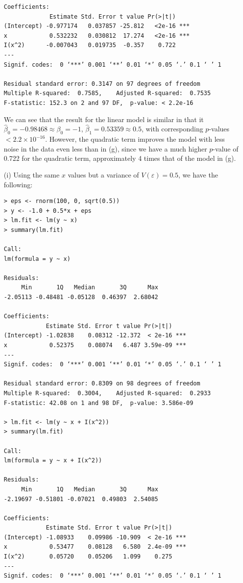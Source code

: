 \begin{itemize}
\begin{lstlisting}
Coefficients:
             Estimate Std. Error t value Pr(>|t|)
(Intercept) -0.977174   0.037857 -25.812   <2e-16 ***
x            0.532232   0.030812  17.274   <2e-16 ***
I(x^2)      -0.007043   0.019735  -0.357    0.722
---
Signif. codes:  0 ‘***’ 0.001 ‘**’ 0.01 ‘*’ 0.05 ‘.’ 0.1 ‘ ’ 1

Residual standard error: 0.3147 on 97 degrees of freedom
Multiple R-squared:  0.7585,    Adjusted R-squared:  0.7535
F-statistic: 152.3 on 2 and 97 DF,  p-value: < 2.2e-16
        \end{lstlisting}
        We can see that the result for the linear model is similar in that it
        $\hat{\beta}_0 = -0.98468 \approx \beta_0 = -1$,
        $\hat{\beta}_1 = 0.53359 \approx 0.5$, with corresponding $p$-values
        $< 2.2 \times {10}^{-16}$. However, the quadratic term improves the
        model with less noise in the data even less than in (g), since we have
        a much higher $p$-value of 0.722 for the quadratic term, approximately
        4 times that of the model in (g).
    \item[(i)] Using the same $x$ values but a variance of $V(\varepsilon) = 0.5$,
        we have the following:
        \begin{lstlisting}
> eps <- rnorm(100, 0, sqrt(0.5))
> y <- -1.0 + 0.5*x + eps
> lm.fit <- lm(y ~ x)
> summary(lm.fit)

Call:
lm(formula = y ~ x)

Residuals:
     Min       1Q   Median       3Q      Max
-2.05113 -0.48481 -0.05128  0.46397  2.68042

Coefficients:
            Estimate Std. Error t value Pr(>|t|)
(Intercept) -1.02838    0.08312 -12.372  < 2e-16 ***
x            0.52375    0.08074   6.487 3.59e-09 ***
---
Signif. codes:  0 ‘***’ 0.001 ‘**’ 0.01 ‘*’ 0.05 ‘.’ 0.1 ‘ ’ 1

Residual standard error: 0.8309 on 98 degrees of freedom
Multiple R-squared:  0.3004,    Adjusted R-squared:  0.2933
F-statistic: 42.08 on 1 and 98 DF,  p-value: 3.586e-09

> lm.fit <- lm(y ~ x + I(x^2))
> summary(lm.fit)

Call:
lm(formula = y ~ x + I(x^2))

Residuals:
     Min       1Q   Median       3Q      Max
-2.19697 -0.51801 -0.07021  0.49803  2.54085

Coefficients:
            Estimate Std. Error t value Pr(>|t|)
(Intercept) -1.08933    0.09986 -10.909  < 2e-16 ***
x            0.53477    0.08128   6.580  2.4e-09 ***
I(x^2)       0.05720    0.05206   1.099    0.275
---
Signif. codes:  0 ‘***’ 0.001 ‘**’ 0.01 ‘*’ 0.05 ‘.’ 0.1 ‘ ’ 1


\end{lstlisting}
\end{itemize}
